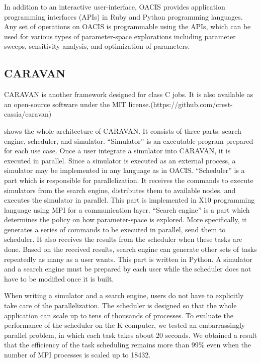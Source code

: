 In addition to an interactive user-interface, OACIS provides application programming interfaces (APIs) in Ruby and Python programming languages.
Any set of operations on OACIS is programmable using the APIs, which can be used for various types of parameter-space explorations including parameter sweeps, sensitivity analysis, and optimization of parameters.

\subsection{CARAVAN}
\label{ss:CARAVAN}
CARAVAN is another framework designed for class C jobs.
It is also available as an open-source software under the MIT license.(https://github.com/crest-cassia/caravan)

 shows the whole architecture of CARAVAN. It consists of three parts: search engine, scheduler, and simulator.
``Simulator'' is an executable program prepared for each use case. Once a user integrate a simulator into CARAVAN, it is executed in parallel.
Since a simulator is executed as an external process, a simulator may be implemented in any language as in OACIS.
``Scheduler'' is a part which is responsible for parallelization. It receives the commands to execute simulators from the search engine, distributes them to available nodes, and executes the simulator in parallel.
This part is implemented in X10 programming language using MPI for a communication layer.
``Search engine'' is a part which determines the policy on how parameter-space is explored.
More specifically, it generates a series of commands to be executed in parallel, send them to scheduler.
It also receives the results from the scheduler when these tasks are done.
Based on the received results, search engine can generate other sets of tasks repeatedly as many as a user wants.
This part is written in Python.
A simulator and a search engine must be prepared by each user while the scheduler does not have to be modified once it is built.

When writing a simulator and a search engine, users do not have to explicitly take care of the parallelization.
The scheduler is designed so that the whole application can scale up to tens of thousands of processes.
To evaluate the performance of the scheduler on the K computer, we tested an embarrassingly parallel problem, in which each task takes about 20 seconds.
We obtained a result that the efficiency of the task scheduling remains more than 99\% even when the number of MPI processes is scaled up to 18432.

